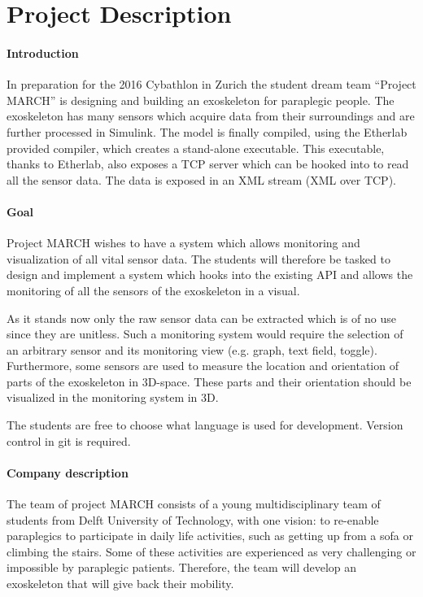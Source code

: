 \chapter{Project Description}
\pagebreak
\subsubsection{Introduction}
In preparation for the 2016 Cybathlon in Zurich the student dream team ``Project MARCH'' is designing and building an exoskeleton for paraplegic people. The exoskeleton has many sensors which acquire data from their surroundings and are further processed in Simulink. The model is finally compiled, using the Etherlab provided compiler, which creates a stand-alone executable. This executable, thanks to Etherlab, also exposes a TCP server which can be hooked into to read all the sensor data. The data is exposed in an XML stream (XML over TCP).

\subsubsection{Goal}
Project MARCH wishes to have a system which allows monitoring and visualization of all vital sensor data. The students will therefore be tasked to design and implement a system which hooks into the existing API and allows the monitoring of all the sensors of the exoskeleton in a visual.

As it stands now only the raw sensor data can be extracted which is of no use since they are unitless. Such a monitoring system would require the selection of an arbitrary sensor and its monitoring view (e.g. graph, text field, toggle). Furthermore, some sensors are used to measure the location and orientation of parts of the exoskeleton in 3D-space. These parts and their orientation should be visualized in the monitoring system in 3D.

The students are free to choose what language is used for development. Version control in git is required.

\subsubsection{Company description}
The team of project MARCH consists of a young multidisciplinary team of students from Delft University of Technology, with one vision: to re-enable paraplegics to participate in daily life activities, such as getting up from a sofa or climbing the stairs. Some of these activities are experienced as very challenging or impossible by paraplegic patients. Therefore, the team will develop an exoskeleton that will give back their mobility.

